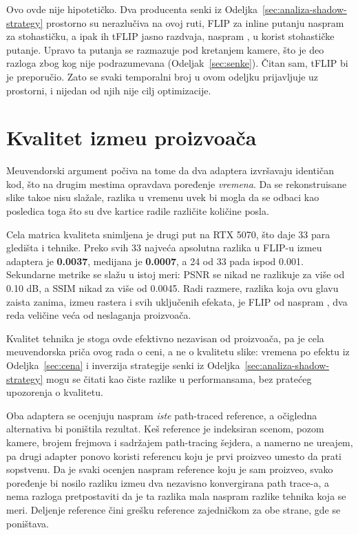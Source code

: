 Ovo ovde nije hipotetičko. Dva producenta senki iz Odeljka~\ref{sec:analiza-shadow-strategy}
prostorno su nerazlu\v{c}iva na ovoj ruti, FLIP \mRtShadowFlip{} za inline putanju naspram
\mMegalightsFlip{} za stohasti\v{c}ku, a ipak ih tFLIP jasno razdvaja, \mRtShadowTflip{}
naspram \mMegalightsTflip{}, u korist stohasti\v{c}ke putanje. Upravo ta putanja se razmazuje pod kretanjem kamere,
\v{s}to je deo razloga zbog kog nije podrazumevana (Odeljak~\ref{sec:senke}). \v{C}itan sam, tFLIP bi je
preporu\v{c}io. Zato se svaki temporalni broj u ovom odeljku prijavljuje uz prostorni, i
nijedan od njih nije cilj optimizacije.

\section{Kvalitet izme\dj{}u proizvo\dj a\v{c}a}
\label{sec:cross-vendor-quality}

Me\dj{}uvendorski argument po\v{c}iva na tome da dva adaptera izvr\v{s}avaju identi\v{c}an kod, \v{s}to na drugim mestima opravdava
poređenje \emph{vremena}. Da se rekonstruisane slike tako\dj e nisu sla\v{z}ale, razlika u vremenu
uvek bi mogla da se odbaci kao posledica toga \v{s}to su dve kartice radile razli\v{c}ite koli\v{c}ine posla.

Cela matrica kvaliteta snimljena je drugi put na RTX 5070, \v{s}to daje 33 para gledi\v{s}ta i tehnike.
Preko svih 33 najve\'ca apsolutna razlika u FLIP-u izme\dj{}u adaptera je \textbf{0.0037},
medijana je \textbf{0.0007}, a 24 od 33 pada ispod 0.001. Sekundarne metrike se sla\v{z}u u
istoj meri: PSNR se nikad ne razlikuje za vi\v{s}e od 0.10 dB, a SSIM nikad za vi\v{s}e od 0.0045. Radi razmere,
razlika koja ovu glavu zaista zanima, izme\dj{}u rastera i svih uklju\v{c}enih efekata, je
FLIP od \qRasterFlip{} naspram \qAllRtFlip{}, dva reda veli\v{c}ine ve\'ca od neslaganja
proizvo\dj a\v{c}a.

Kvalitet tehnika je stoga ovde efektivno nezavisan od proizvo\dj a\v{c}a, pa je cela
me\dj{}uvendorska pri\v{c}a ovog rada o ceni, a ne o kvalitetu slike:
vremena po efektu iz Odeljka~\ref{sec:cena} i inverzija strategije senki iz
Odeljka~\ref{sec:analiza-shadow-strategy} mogu se \v{c}itati kao \v{c}iste razlike u performansama, bez
pratećeg upozorenja o kvalitetu.

Oba adaptera se ocenjuju naspram \emph{iste} path-traced reference, a o\v{c}igledna alternativa
bi poni\v{s}tila rezultat. Ke\v{s} reference je indeksiran scenom, pozom kamere, brojem frejmova i sadr\v{z}ajem
path-tracing \v{s}ejdera, a namerno ne ure\dj{}ajem, pa drugi adapter ponovo koristi referencu
koju je prvi proizveo umesto da prati sopstvenu. Da je svaki ocenjen naspram reference koju je sam proizveo,
svako poređenje bi nosilo razliku izme\dj{}u dva nezavisno konvergirana path trace-a, a nema razloga
pretpostaviti da je ta razlika mala naspram razlike tehnika koja se meri. Deljenje reference \v{c}ini
gre\v{s}ku reference zajedni\v{c}kom za obe strane, gde se poni\v{s}tava.


